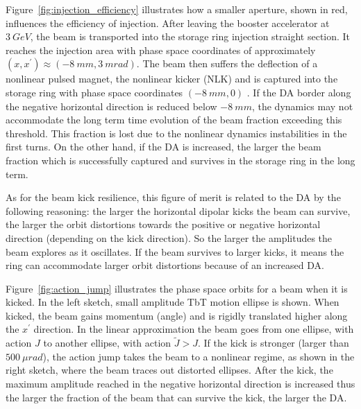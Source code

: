 Figure~\ref{fig:injection_efficiency}  illustrates how a smaller aperture, shown in red, influences the efficiency of injection. After leaving the booster accelerator at $3~\unit{GeV}$, the beam is transported into the storage ring injection straight section. It reaches the injection area with phase space coordinates of approximately $(x, x^\prime)\approx(-8~\unit{mm}, 3~\unit{m rad})$. The beam then suffers the deflection of a nonlinear pulsed magnet, the nonlinear kicker (NLK) and is captured into the storage ring with phase space coordinates $(-8~ \unit{mm}, 0)$ \cite{liu_injection_2016}. If the DA border along the negative horizontal direction is reduced below $-8~\unit{mm}$, the dynamics may not accommodate the long term time evolution of the beam fraction exceeding this threshold. This fraction is lost due to the nonlinear dynamics instabilities in the first turns. On the other hand, if the DA is increased, the larger the beam fraction which is successfully captured and survives in the storage ring in the long term.

As for the beam kick resilience, this figure of merit is related to the DA by the following reasoning: the larger the horizontal dipolar kicks the beam can survive, the larger the orbit distortions towards the positive or negative horizontal direction (depending on the kick direction). So the larger the amplitudes the beam explores as it oscillates. If the beam survives to larger kicks, it means the ring can accommodate larger orbit distortions because of an increased DA.

Figure~\ref{fig:action_jump} illustrates the phase space orbits for a beam when it is kicked. In the left sketch, small amplitude TbT motion ellipse is shown. When kicked, the beam gains momentum (angle) and is rigidly translated higher along the $x^{\prime}$ direction. In the linear approximation the beam goes from one ellipse, with action $J$ to another ellipse, with action $\tilde{J}>J$. If the kick is stronger (larger than $500~\unit{\mu rad}$), the action jump takes the beam to a nonlinear regime, as shown in the right sketch, where the beam traces out distorted ellipses. After the kick, the maximum amplitude reached in the negative horizontal direction is increased thus the larger the fraction of the beam that can survive the kick, the larger the DA.

